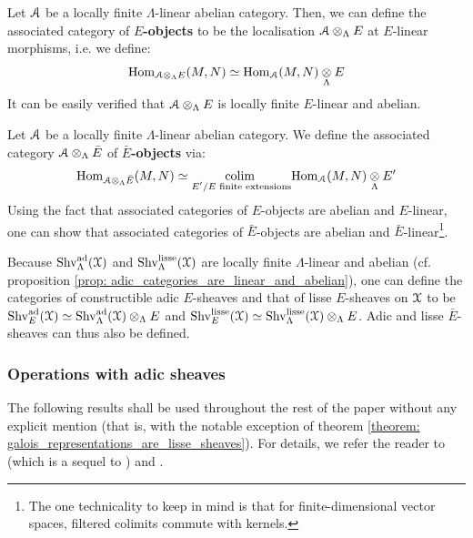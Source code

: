             \begin{definition}[$E$-objects] \label{def: E_objects}
                Let $\mathcal{A}$ be a locally finite $\Lambda$-linear abelian category. Then, we can define the associated category of \textbf{$E$-objects} to be the localisation $\calA \tensor_{\Lambda} E$ at $E$-linear morphisms, i.e. we define:
                    $$\Hom_{\calA \tensor_{\Lambda} E}(M, N) \cong \Hom_{\calA}(M, N) \tensor_{\Lambda} E$$
                It can be easily verified that $\calA \tensor_{\Lambda} E$ is locally finite $E$-linear and abelian.
            \end{definition}
            \begin{definition} \label{def: bar_E_objects}
                Let $\mathcal{A}$ be a locally finite $\Lambda$-linear abelian category. We define the associated category $\calA \tensor_{\Lambda} \bar{E}$ of \textbf{$\bar{E}$-objects} via:
                    $$\Hom_{\calA \tensor_{\Lambda} \bar{E}}(M, N) \cong \underset{\text{$E'/E$ finite extensions}}{\colim} \Hom_{\calA}(M, N) \tensor_{\Lambda} E'$$
                Using the fact that associated categories of $E$-objects are abelian and $E$-linear, one can show that associated categories of $\bar{E}$-objects are abelian and $\bar{E}$-linear\footnote{The one technicality to keep in mind is that for finite-dimensional vector spaces, filtered colimits commute with kernels.}. 
            \end{definition}
            \begin{example} \label{example: E_sheaves}
                Because $\mathrm{Shv}_{\Lambda}^{\mathrm{ad}}(\mathcal{X})$ and $\mathrm{Shv}_{\Lambda}^{\mathrm{lisse}}(\mathcal{X})$ are locally finite $\Lambda$-linear and abelian (cf. proposition \ref{prop: adic_categories_are_linear_and_abelian}), one can define the categories of constructible adic $E$-sheaves and that of lisse $E$-sheaves on $\mathcal{X}$ to be $\Shv_E^{\ad}(\calX) \cong \Shv_{\Lambda}^{\ad}(\calX) \tensor_{\Lambda} E$ and $\Shv_E^{\lisse}(\calX) \cong \Shv_{\Lambda}^{\lisse}(\calX) \tensor_{\Lambda} E$. Adic and lisse $\bar{E}$-sheaves can thus also be defined.
            \end{example}
            
        \subsubsection{Operations with adic sheaves}
            The following results shall be used throughout the rest of the paper without any explicit mention (that is, with the notable exception of theorem \ref{theorem: galois_representations_are_lisse_sheaves}). For details, we refer the reader to \cite[Sections 6-8]{laszlo_olsson_adic_sheaves_on_artin_stacks_2} (which is a sequel to \cite{laszlo_olsson_adic_sheaves_on_artin_stacks_1}) and \cite[Sections II.7-II.10]{kiehl_weissauer_weil_conjecture_perverse_sheaves_and_l_adic_fourier_transform}.
            
